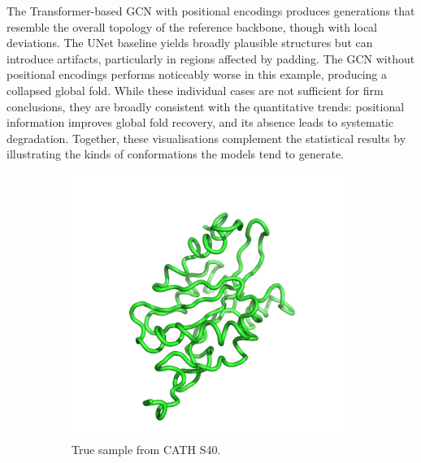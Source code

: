 \documentclass[a4paper,12pt]{article}
\begin{document}
The Transformer-based GCN with positional encodings produces generations that resemble the overall topology of the reference backbone, though with local deviations. The UNet baseline yields broadly plausible structures but can introduce artifacts, particularly in regions affected by padding. The GCN without positional encodings performs noticeably worse in this example, 
producing a collapsed global fold. While these individual cases are not sufficient for firm conclusions, they are broadly consistent with the quantitative trends: positional information improves global fold recovery, and its absence leads to systematic degradation. Together, these visualisations complement the statistical results by illustrating the kinds of conformations the models tend to generate.

\begin{figure}[htbp]
    \centering
    \begin{subfigure}[b]{0.495\textwidth}
        \centering
        \includegraphics[width=\linewidth]{1ak6A00_true.png}
        \caption{True sample from CATH S40.}
        \label{fig:sample-true}
    \end{subfigure}
    \begin{subfigure}[b]{0.495\textwidth}
        \centering

\end{subfigure}
\end{figure}
\end{document}
